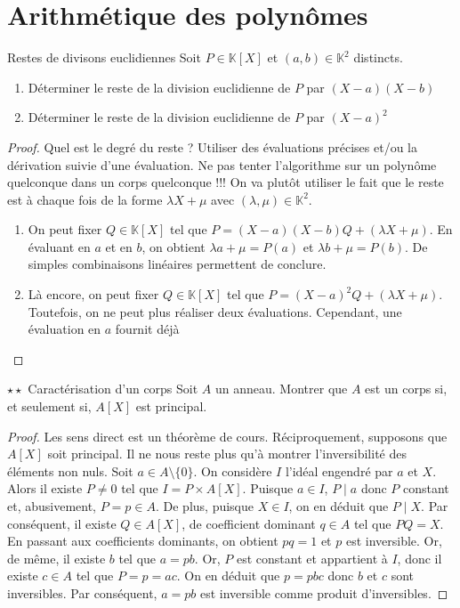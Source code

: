 \documentclass[french,a4paper]{article}
\newcommand{\K}{\mathbb{K}}
\theoremstyle{plain}
\theoremstyle{definition}
\theoremstyle{remark}
\begin{document}
\section{Arithmétique des polynômes}

\begin{ex}{Restes de divisons euclidiennes}
	Soit $P \in \K[X]$ et $(a,b) \in\K^2$ distincts. 
	\begin{enumerate}
		\item Déterminer le reste de la division euclidienne de $P$ par $(X-a)(X-b)$
		\item Déterminer le reste de la division euclidienne de $P$ par $(X-a)^2$
	\end{enumerate}
\end{ex}
\begin{proof}
	Quel est le degré du reste ? Utiliser des évaluations précises et/ou la dérivation suivie d'une évaluation. Ne pas tenter l'algorithme sur un polynôme quelconque dans un corps quelconque !!! On va plutôt utiliser le fait que le reste est à chaque fois de la forme $\lambda X + \mu$ avec $(\lambda,\mu) \in \K^2$.
	\begin{enumerate}
		\item On peut fixer $Q \in\K[X]$ tel que $P=(X-a)(X-b)Q + (\lambda X + \mu)$. En évaluant en $a$ et en $b$, on obtient $\lambda a + \mu =P(a)$ et $\lambda b + \mu = P(b)$. De simples combinaisons linéaires permettent de conclure.
		\item Là encore, on peut fixer $Q \in\K[X]$ tel que $P=(X-a)^2Q + (\lambda X + \mu)$. Toutefois, on ne peut plus réaliser deux évaluations. Cependant, une évaluation en $a$ fournit déjà
	\end{enumerate}
\end{proof}

\begin{ex}{$\star\star$ Caractérisation d'un corps}
	Soit $A$ un anneau. Montrer que $A$ est un corps si, et seulement si, $A[X]$ est principal.
\end{ex}
\begin{proof}
	Les sens direct est un théorème de cours. Réciproquement, supposons que $A[X]$ soit principal. Il ne nous reste plus qu'à montrer l'inversibilité des éléments non nuls. Soit $a\in A\setminus\{0\}$. On considère $I$ l'idéal engendré par $a$ et $X$. Alors il existe $P\ne 0$ tel que $I=P\times A[X]$. Puisque $a\in I$, $P\mid a$ donc $P$ constant et, abusivement, $P=p\in A$. De plus, puisque $X\in I$, on en déduit que $P\mid X$. Par conséquent, il existe $Q\in A[X]$, de coefficient dominant $q\in A$ tel que $PQ=X$. En passant aux coefficients dominants, on obtient $pq=1$ et $p$ est inversible. Or, de même, il existe $b$ tel que $a=pb$. Or, $P$ est constant et appartient à $I$, donc il existe $c\in A$ tel que $P=p=ac$. On en déduit que $p=pbc$ donc $b$ et $c$ sont inversibles.  Par conséquent, $a=pb$ est inversible comme produit d'inversibles. 
\end{proof}
\end{document}
